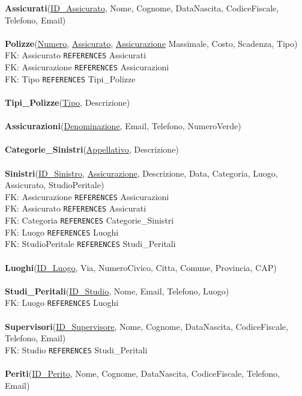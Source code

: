 \documentclass[a4paper,12pt]{report}
\begin{document}
\textbf{Assicurati}(\underline{ID\_Assicurato}, Nome, Cognome, DataNascita, CodiceFiscale, Telefono, Email)
\\
\\
\textbf{Polizze}(\underline{Numero}, \underline{Assicurato}, \underline{Assicurazione} Massimale, Costo, Scadenza, Tipo) \\
FK: Assicurato \texttt{REFERENCES} Assicurati \\
FK: Assicurazione \texttt{REFERENCES} Assicurazioni \\
FK: Tipo \texttt{REFERENCES} Tipi\_Polizze  \\
\\
\textbf{Tipi\_Polizze}(\underline{Tipo}, Descrizione)
\\
\\
\textbf{Assicurazioni}(\underline{Denominazione}, Email, Telefono, NumeroVerde) \\
\\
\textbf{Categorie\_Sinistri}(\underline{Appellativo}, Descrizione) \\
\\
\textbf{Sinistri}(\underline{ID\_Sinistro}, \underline{Assicurazione}, Descrizione, Data,  Categoria, Luogo, Assicurato, StudioPeritale) \\
FK: Assicurazione \texttt{REFERENCES} Assicurazioni \\
FK: Assicurato \texttt{REFERENCES} Assicurati \\
FK: Categoria \texttt{REFERENCES} Categorie\_Sinistri  \\
FK: Luogo \texttt{REFERENCES} Luoghi \\
FK: StudioPeritale \texttt{REFERENCES} Studi\_Peritali \\
\\
\textbf{Luoghi}(\underline{ID\_Luogo}, Via, NumeroCivico, Citta, Comune, Provincia, CAP) \\
\\
\textbf{Studi\_Peritali}(\underline{ID\_Studio},  Nome, Email, Telefono, Luogo) \\
FK: Luogo \texttt{REFERENCES} Luoghi \\
\\
\textbf{Supervisori}(\underline{ID\_Supervisore}, Nome, Cognome, DataNascita, CodiceFiscale, Telefono, Email) \\
FK: Studio \texttt{REFERENCES} Studi\_Peritali \\
\\
\textbf{Periti}(\underline{ID\_Perito}, Nome, Cognome, DataNascita, CodiceFiscale, Telefono, Email) \\
\end{document}
